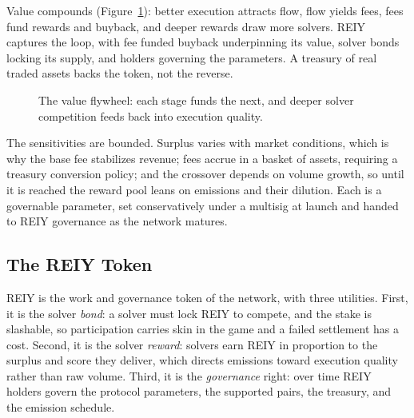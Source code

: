 \documentclass[10pt,sigconf,nonacm]{acmart}
\theoremstyle{reiythm}
\begin{document}
Value compounds (Figure~\ref{fig:flywheel}): better execution attracts flow, flow
yields fees, fees fund rewards and buyback, and deeper rewards draw more solvers. REIY
captures the loop, with fee funded buyback underpinning its value, solver bonds locking
its supply, and holders governing the parameters. A treasury of real traded assets
backs the token, not the reverse.

\begin{figure}[htbp]
  \centering
  \caption{The value flywheel: each stage funds the next, and deeper solver
    competition feeds back into execution quality.}
  \label{fig:flywheel}
\end{figure}

The sensitivities are bounded. Surplus varies with market conditions, which is why
the base fee stabilizes revenue; fees accrue in a basket of assets, requiring a
treasury conversion policy; and the crossover depends on volume growth, so until it
is reached the reward pool leans on emissions and their dilution. Each is a governable
parameter, set conservatively under a multisig at launch and handed to REIY governance
as the network matures.

\subsection{The REIY Token}

REIY is the work and governance token of the network, with three utilities.
First, it is the solver \emph{bond}: a solver must lock REIY to compete, and the
stake is slashable, so participation carries skin in the game and a failed
settlement has a cost. Second, it is the solver \emph{reward}: solvers earn REIY
in proportion to the surplus and score they deliver, which directs emissions
toward execution quality rather than raw volume. Third, it is the \emph{governance}
right: over time REIY holders govern the protocol parameters, the supported pairs,
the treasury, and the emission schedule.
\end{document}
